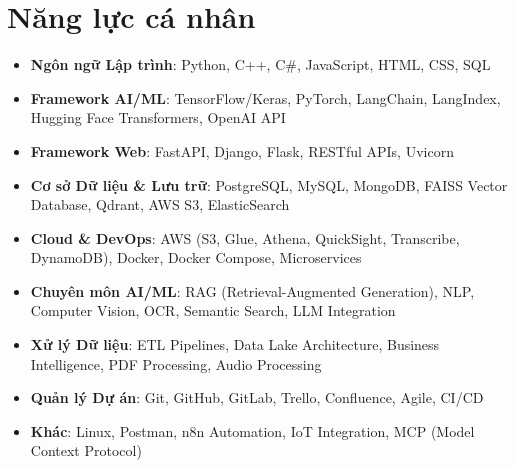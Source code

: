 \documentclass[letterpaper,11pt]{article}
\newcommand{\achievementItem}[1]{
  \item\small{
    {#1 \vspace{-3pt}}
  }
}
\begin{document}
\section{Năng lực cá nhân}
 \begin{itemize}[leftmargin=0.12in]
  \achievementItem{\textbf{Ngôn ngữ Lập trình}: Python, C++, C\#, JavaScript, HTML, CSS, SQL}
  \achievementItem{\textbf{Framework AI/ML}: TensorFlow/Keras, PyTorch, LangChain, LangIndex, Hugging Face Transformers, OpenAI API}
  \achievementItem{\textbf{Framework Web}: FastAPI, Django, Flask, RESTful APIs, Uvicorn}
  \achievementItem{\textbf{Cơ sở Dữ liệu \& Lưu trữ}: PostgreSQL, MySQL, MongoDB, FAISS Vector Database, Qdrant, AWS S3, ElasticSearch}
  \achievementItem{\textbf{Cloud \& DevOps}: AWS (S3, Glue, Athena, QuickSight, Transcribe, DynamoDB), Docker, Docker Compose, Microservices}
  \achievementItem{\textbf{Chuyên môn AI/ML}: RAG (Retrieval-Augmented Generation), NLP, Computer Vision, OCR, Semantic Search, LLM Integration}
  \achievementItem{\textbf{Xử lý Dữ liệu}: ETL Pipelines, Data Lake Architecture, Business Intelligence, PDF Processing, Audio Processing}
  \achievementItem{\textbf{Quản lý Dự án}: Git, GitHub, GitLab, Trello, Confluence, Agile, CI/CD}
  \achievementItem{\textbf{Khác}: Linux, Postman, n8n Automation, IoT Integration, MCP (Model Context Protocol)}
\end{itemize}
 \vspace{-16pt}
\end{document}
